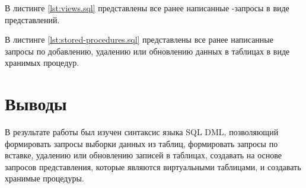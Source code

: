 В листинге \ref{lst:views.sql} представлены все ранее написанные -запросы в виде представлений.



В листинге \ref{lst:stored-procedures.sql} представлены все ранее написанные запросы по добавлению, удалению или обновлению данных в таблицах в виде хранимых процедур.



\section{Выводы}

В результате работы был изучен синтаксис языка SQL DML, позволяющий формировать запросы выборки данных из таблиц, формировать запросы по вставке, удалению или обновлению записей в таблицах, создавать на основе запросов представления, которые являются виртуальными таблицами, и создавать хранимые процедуры.


